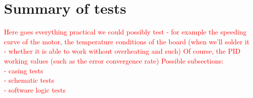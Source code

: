 \section{Summary of tests} \label{chap:tests}
\textcolor{red}{
Here goes everything practical we could possibly test - for example the speeding curve of the motor, the temperature conditions of the board (when we'll solder it - whether it is able to work without overheating and such) 
Of course, the PID working values (such as the error convergence rate)
Possible subsections:\\
    - casing tests \\
    - schematic tests \\
    - software logic tests \\
}

